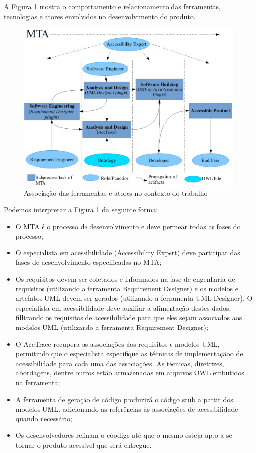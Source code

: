 \documentclass[runningheads,a4paper]{llncs}
\begin{document}
A Figura \ref{fig:association} mostra o comportamento e relacionamento das ferramentas, tecnologias
e atores envolvidos no desenvolvimento do produto.

\begin{figure}[h!]
\centering
\includegraphics[scale=0.25]{./img/developmentNew2.png}
\caption{Associação das ferramentas e atores no contexto do trabalho}
\label{fig:association}
\end{figure}

Podemos interpretar a Figura \ref{fig:association} da seguinte forma:

\begin{itemize}
  \item O MTA é o processo de desenvolvimento e deve permear todas as fases do processo;
  \item O especialista em acessibilidade (Accessibility Expert) deve participar das fases de
desenvolvimento especificadas no MTA;
  \item Os requisitos devem ser coletados e informados na fase de engenharia de requisitos
(utilizando a ferramenta Requirement Designer) e os modelos e artefatos UML
devem ser gerados (utilizando a ferramenta UML Designer). O especialista em
acessibilidade deve auxiliar a alimentação destes dados, filltrando os requisitos de
acessibilidade para que eles sejam associados aos modelos UML (utilizando a ferramenta
Requirement Designer);
  \item O AccTrace recupera as associações dos requisitos e modelos UML, permitindo que o especialista especifique as técnicas de implementaçãoo de acessibilidade para cada uma das associações. As técnicas, diretrizes, abordagens, dentre outros estão armazenadas em arquivos OWL embutidos na ferramenta;
  \item A ferramenta de geração de código produzirá o código stub a partir dos modelos
UML, adicionando as referências às associações de acessibilidade quando necessário;
  \item Os desenvolvedores refinam o cóodigo até que o mesmo esteja apto a se tornar o
produto acessível que será entregue.
\end{itemize}
\end{document}
